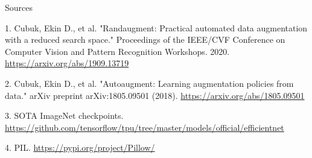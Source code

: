 \documentclass{beamer}
\begin{document}
\begin{frame}{Sources}
\begin{thebibliography}{0}

   1. Cubuk, Ekin D., et al. "Randaugment: Practical automated data augmentation with a reduced search space." Proceedings of the IEEE/CVF Conference on Computer Vision and Pattern Recognition Workshops. 2020. \url{https://arxiv.org/abs/1909.13719} 
  
    2. Cubuk, Ekin D., et al. "Autoaugment: Learning augmentation policies from data." arXiv preprint arXiv:1805.09501 (2018). \url{https://arxiv.org/abs/1805.09501} 
   
    3. SOTA ImageNet checkpoints. \url{https://github.com/tensorflow/tpu/tree/master/models/official/efficientnet}
   
    4. PIL. \url{https://pypi.org/project/Pillow/}
   
\end{thebibliography}
\end{frame} 
\end{document}
